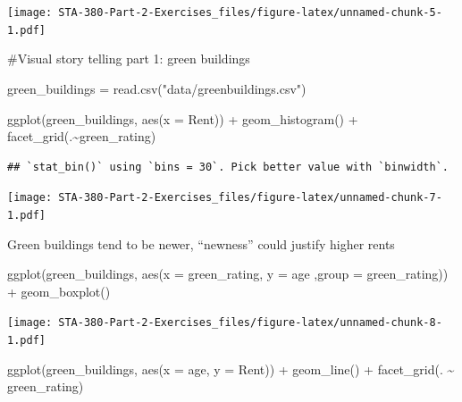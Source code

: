 \documentclass[
]{article}
\newenvironment{Shaded}{\begin{snugshade}}{\end{snugshade}}
\newcommand{\AttributeTok}[1]{\textcolor[rgb]{0.77,0.63,0.00}{#1}}
\newcommand{\FunctionTok}[1]{\textcolor[rgb]{0.00,0.00,0.00}{#1}}
\newcommand{\NormalTok}[1]{#1}
\newcommand{\OtherTok}[1]{\textcolor[rgb]{0.56,0.35,0.01}{#1}}
\newcommand{\SpecialCharTok}[1]{\textcolor[rgb]{0.00,0.00,0.00}{#1}}
\newcommand{\StringTok}[1]{\textcolor[rgb]{0.31,0.60,0.02}{#1}}
\begin{document}
\texttt{[image: STA-380-Part-2-Exercises\_files/figure-latex/unnamed-chunk-5-1.pdf]}

\#Visual story telling part 1: green buildings

\begin{Shaded}
\begin{Highlighting}[]
\NormalTok{green\_buildings }\OtherTok{=} \FunctionTok{read.csv}\NormalTok{(}\StringTok{"data/greenbuildings.csv"}\NormalTok{)}
\end{Highlighting}
\end{Shaded}

\begin{Shaded}
\begin{Highlighting}[]
\FunctionTok{ggplot}\NormalTok{(green\_buildings, }\FunctionTok{aes}\NormalTok{(}\AttributeTok{x =}\NormalTok{ Rent)) }\SpecialCharTok{+} \FunctionTok{geom\_histogram}\NormalTok{() }\SpecialCharTok{+} \FunctionTok{facet\_grid}\NormalTok{(.}\SpecialCharTok{\textasciitilde{}}\NormalTok{green\_rating)}
\end{Highlighting}
\end{Shaded}

\begin{verbatim}
## `stat_bin()` using `bins = 30`. Pick better value with `binwidth`.
\end{verbatim}

\texttt{[image: STA-380-Part-2-Exercises\_files/figure-latex/unnamed-chunk-7-1.pdf]}

Green buildings tend to be newer, ``newness'' could justify higher rents

\begin{Shaded}
\begin{Highlighting}[]
\FunctionTok{ggplot}\NormalTok{(green\_buildings, }\FunctionTok{aes}\NormalTok{(}\AttributeTok{x =}\NormalTok{ green\_rating, }\AttributeTok{y =}\NormalTok{ age ,}\AttributeTok{group =}\NormalTok{ green\_rating)) }\SpecialCharTok{+} \FunctionTok{geom\_boxplot}\NormalTok{()}
\end{Highlighting}
\end{Shaded}

\texttt{[image: STA-380-Part-2-Exercises\_files/figure-latex/unnamed-chunk-8-1.pdf]}

\begin{Shaded}
\begin{Highlighting}[]
\FunctionTok{ggplot}\NormalTok{(green\_buildings, }\FunctionTok{aes}\NormalTok{(}\AttributeTok{x =}\NormalTok{ age, }\AttributeTok{y =}\NormalTok{ Rent)) }\SpecialCharTok{+} \FunctionTok{geom\_line}\NormalTok{() }\SpecialCharTok{+} \FunctionTok{facet\_grid}\NormalTok{(. }\SpecialCharTok{\textasciitilde{}}\NormalTok{ green\_rating)}
\end{Highlighting}
\end{Shaded}
\end{document}
